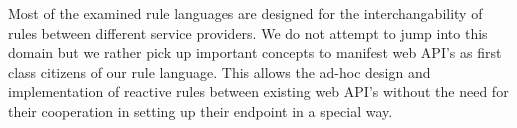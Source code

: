 \documentclass[11pt]{article}%
\begin{document}
Most of the examined rule languages are designed for the interchangability of rules between different service providers. We do not attempt to jump into this domain but we rather pick up important concepts to manifest web API's as first class citizens of our rule language. This allows the ad-hoc design and implementation of reactive rules between existing web API's without the need for their cooperation in setting up their endpoint in a special way.
\end{document}
